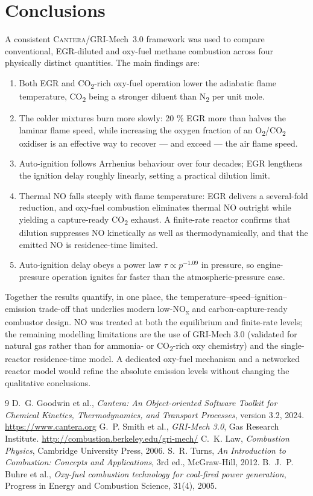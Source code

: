 \documentclass[11pt,a4paper]{article}
\begin{document}
\section{Conclusions}
A consistent \textsc{Cantera}/GRI-Mech~3.0 framework was used to compare
conventional, EGR-diluted and oxy-fuel methane combustion across four physically
distinct quantities. The main findings are:
\begin{enumerate}
  \item Both EGR and CO\textsubscript{2}-rich oxy-fuel operation lower the
  adiabatic flame temperature, CO\textsubscript{2} being a stronger diluent than
  N\textsubscript{2} per unit mole.
  \item The colder mixtures burn more slowly: 20 \% EGR more than
  halves the laminar flame speed, while increasing the oxygen fraction of an
  O\textsubscript{2}/CO\textsubscript{2} oxidiser is an effective way to recover
  --- and exceed --- the air flame speed.
  \item Auto-ignition follows Arrhenius behaviour over four decades; EGR lengthens
  the ignition delay roughly linearly, setting a practical dilution limit.
  \item Thermal NO falls steeply with flame temperature: EGR delivers a several-fold
  reduction, and oxy-fuel combustion eliminates thermal NO outright while
  yielding a capture-ready CO\textsubscript{2} exhaust. A finite-rate reactor
  confirms that dilution suppresses NO kinetically as well as thermodynamically,
  and that the emitted NO is residence-time limited.
  \item Auto-ignition delay obeys a power law $\tau \propto p^{-1.09}$ in
  pressure, so engine-pressure operation ignites far faster than the
  atmospheric-pressure case.
\end{enumerate}
Together the results quantify, in one place, the temperature--speed--ignition--
emission trade-off that underlies modern low-NO\textsubscript{x} and
carbon-capture-ready combustor design. NO was treated at both the equilibrium and
finite-rate levels; the remaining modelling limitations are the use of GRI-Mech
3.0 (validated for natural gas rather than for ammonia- or CO\textsubscript{2}-rich
oxy chemistry) and the single-reactor residence-time model. A dedicated oxy-fuel
mechanism and a networked reactor model would refine the absolute emission levels
without changing the qualitative conclusions.

\begin{thebibliography}{9}
 D.~G. Goodwin et al., \emph{Cantera: An Object-oriented
Software Toolkit for Chemical Kinetics, Thermodynamics, and Transport
Processes}, version 3.2, 2024. \url{https://www.cantera.org}
 G.~P. Smith et al., \emph{GRI-Mech 3.0}, Gas Research Institute.
\url{http://combustion.berkeley.edu/gri-mech/}
 C.~K. Law, \emph{Combustion Physics}, Cambridge University Press,
2006.
 S.~R. Turns, \emph{An Introduction to Combustion: Concepts and
Applications}, 3rd ed., McGraw-Hill, 2012.
 B.~J.~P. Buhre et al., \emph{Oxy-fuel combustion technology for
coal-fired power generation}, Progress in Energy and Combustion Science, 31(4),
2005.
\end{thebibliography}
\end{document}
